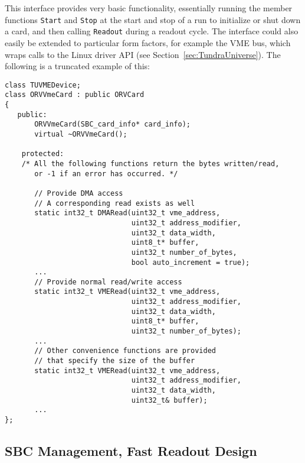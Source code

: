 This interface provides very basic functionality, essentially running the member functions \lstinline!Start! and \lstinline!Stop!
at the start and stop of a run to initialize or shut down a card, and then calling \lstinline!Readout! during a readout cycle.  
The interface could also easily be extended to particular form factors, for example the VME bus, which wraps calls to the Linux
driver API (see Section~\ref{sec:TundraUniverse}).  The following is a truncated example of this:
			\begin{lstlisting}
class TUVMEDevice;
class ORVVmeCard : public ORVCard 
{
   public:
       ORVVmeCard(SBC_card_info* card_info);
       virtual ~ORVVmeCard(); 

    protected:
	/* All the following functions return the bytes written/read,
	   or -1 if an error has occurred. */
	
       // Provide DMA access
       // A corresponding read exists as well 
       static int32_t DMARead(uint32_t vme_address,
                              uint32_t address_modifier,
                              uint32_t data_width,
                              uint8_t* buffer,
                              uint32_t number_of_bytes,
                              bool auto_increment = true);
       ...
       // Provide normal read/write access 
       static int32_t VMERead(uint32_t vme_address,
                              uint32_t address_modifier,
                              uint32_t data_width,
                              uint8_t* buffer,
                              uint32_t number_of_bytes);
       ...
       // Other convenience functions are provided
       // that specify the size of the buffer
       static int32_t VMERead(uint32_t vme_address,
                              uint32_t address_modifier,
                              uint32_t data_width,
                              uint32_t& buffer);
       ...
};
			\end{lstlisting}

		\subsection{SBC Management, Fast Readout Design}	

